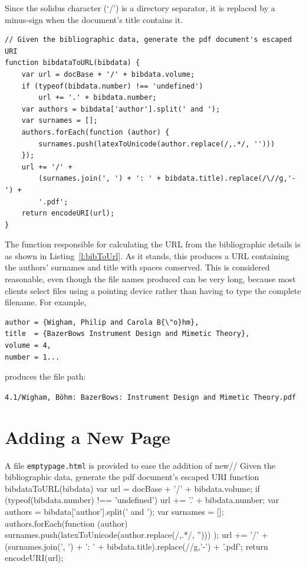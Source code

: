 \documentclass[a4paper,10pt]{SMR}
\begin{document}
Since the solidus character (`/') is a directory separator,
it is replaced by a minus-sign when the document's title contains it.

\begin{lstlisting}
// Given the bibliographic data, generate the pdf document's escaped URI
function bibdataToURL(bibdata) {
	var url = docBase + '/' + bibdata.volume;
	if (typeof(bibdata.number) !== 'undefined')
		url += '.' + bibdata.number;
	var authors = bibdata['author'].split(' and ');
	var surnames = [];
	authors.forEach(function (author) {
		surnames.push(latexToUnicode(author.replace(/,.*/, '')))
	});
	url += '/' + 
		(surnames.join(', ') + ': ' + bibdata.title).replace(/\//g,'-') +
		'.pdf';
	return encodeURI(url);
}
\end{lstlisting}

The function responsible for calculating the URL from the bibliographic
details is as shown in Listing~\ref{l:bibToUrl}. As it stands, this produces
a URL containing the authors' surnames and title with spaces conserved.
This is considered reasonable, even though the file names produced can be
very long, because most clients select files using a pointing device
rather than having to type the complete filename. For example,

\begin{verbatim}
author = {Wigham, Philip and Carola B{\"o}hm},
title  = {BazerBows Instrument Design and Mimetic Theory},
volume = 4,
number = 1...
\end{verbatim}

produces the file path:

\noindent
\verb!4.1/Wigham, Böhm: BazerBows: Instrument Design and Mimetic Theory.pdf!

\section{Adding a New Page}

A file \verb!emptypage.html! is provided to ease the addition of new// Given the bibliographic data, generate the pdf document's escaped URI
function bibdataToURL(bibdata) {
	var url = docBase + '/' + bibdata.volume;
	if (typeof(bibdata.number) !== 'undefined')
		url += '.' + bibdata.number;
	var authors = bibdata['author'].split(' and ');
	var surnames = [];
	authors.forEach(function (author) {
		surnames.push(latexToUnicode(author.replace(/,.*/, '')))
	});
	url += '/' + 
		(surnames.join(', ') + ': ' + bibdata.title).replace(/\//g,'-') +
		'.pdf';
	return encodeURI(url);
}
\end{document}
